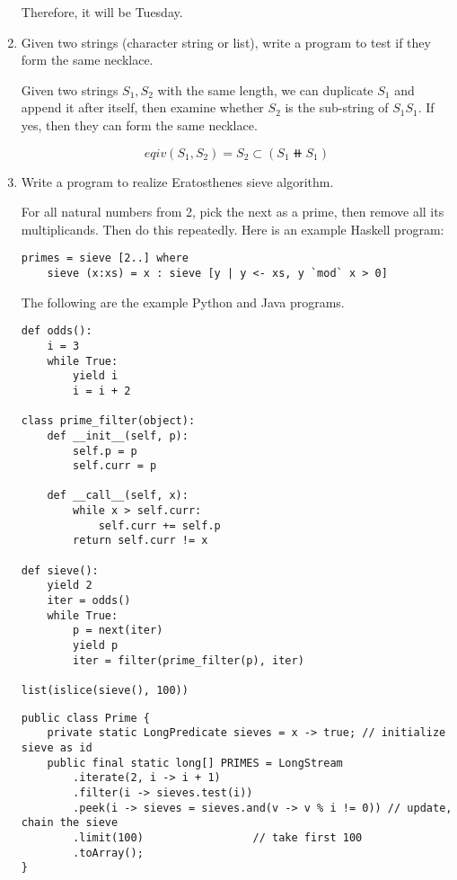 \documentclass[UTF8]{article}
\begin{document}
\begin{enumerate}
Therefore, it will be Tuesday.

\item {Given two strings (character string or list), write a program to test if they form the same necklace.}

Given two strings $S_1, S_2$ with the same length, we can duplicate $S_1$ and append it after itself, then examine whether $S_2$ is the sub-string of $S_1S_1$. If yes, then they can form the same necklace.

\[
eqiv(S_1, S_2) = S_2 \subset (S_1 \doubleplus S_1)
\]

\item {Write a program to realize Eratosthenes sieve algorithm.}

For all natural numbers from 2, pick the next as a prime, then remove all its multiplicands. Then do this repeatedly. Here is an example Haskell program:

\lstset{language=Haskell, frame=single}
\begin{lstlisting}
primes = sieve [2..] where
    sieve (x:xs) = x : sieve [y | y <- xs, y `mod` x > 0]
\end{lstlisting}

The following are the example Python and Java programs.

\lstset{language=Python}
\begin{lstlisting}
def odds():
    i = 3
    while True:
        yield i
        i = i + 2

class prime_filter(object):
    def __init__(self, p):
        self.p = p
        self.curr = p

    def __call__(self, x):
        while x > self.curr:
            self.curr += self.p
        return self.curr != x

def sieve():
    yield 2
    iter = odds()
    while True:
        p = next(iter)
        yield p
        iter = filter(prime_filter(p), iter)

list(islice(sieve(), 100))
\end{lstlisting}

\lstset{language=Java}
\begin{lstlisting}
public class Prime {
    private static LongPredicate sieves = x -> true; // initialize sieve as id
    public final static long[] PRIMES = LongStream
        .iterate(2, i -> i + 1)
        .filter(i -> sieves.test(i))
        .peek(i -> sieves = sieves.and(v -> v % i != 0)) // update, chain the sieve
        .limit(100)                 // take first 100
        .toArray();
}
\end{lstlisting}


\end{enumerate}
\end{document}
